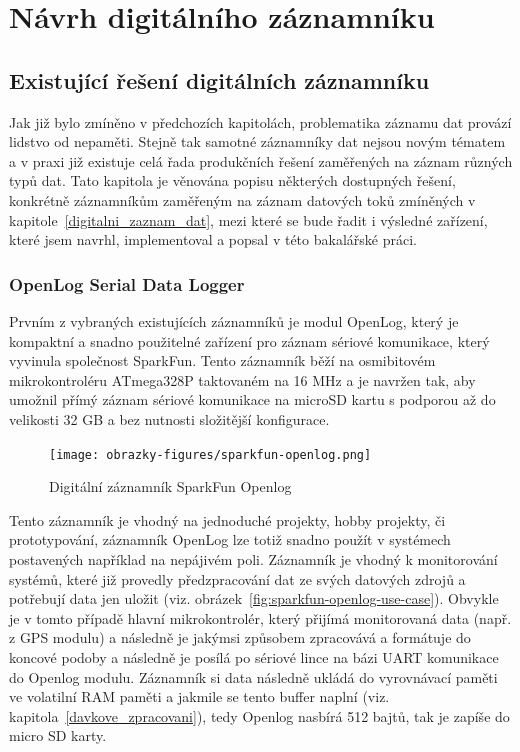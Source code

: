 \chapter{Návrh digitálního záznamníku}
\label{navrh_digitalniho_zaznamniku}

\section{Existující řešení digitálních záznamníku}
Jak již bylo zmíněno v předchozích kapitolách, problematika záznamu dat provází lidstvo od nepaměti. Stejně tak samotné záznamníky dat nejsou novým tématem a v praxi již existuje celá řada produkčních řešení zaměřených na záznam různých typů dat. Tato kapitola je věnována popisu některých dostupných řešení, konkrétně záznamníkům zaměřeným na záznam datových toků zmíněných v kapitole~\ref{digitalni_zaznam_dat}, mezi které se bude řadit i výsledné zařízení, které jsem navrhl, implementoval a popsal v této bakalářské práci. 


\subsection{OpenLog Serial Data Logger}
\label{openlog_serial_datalogger_module}
Prvním z vybraných existujících záznamníků je modul OpenLog, který je kompaktní a snadno použitelné zařízení pro záznam sériové komunikace, který vyvinula společnost SparkFun. Tento záznamník běží na osmibitovém mikrokontroléru ATmega328P taktovaném na 16 MHz a je navržen tak, aby umožnil přímý záznam sériové komunikace na microSD kartu s podporou až do velikosti 32 GB a bez nutnosti složitější konfigurace. \cite{sparkfun_openlog_tutorial}

\begin{figure}[h]
    \centering
    \texttt{[image: obrazky-figures/sparkfun-openlog.png]}
    
    \caption{Digitální záznamník SparkFun Openlog \cite{cirkit_openlog}}
    \label{fig:sparkfun-openlog}
\end{figure}

Tento záznamník je vhodný na jednoduché projekty, hobby projekty, či prototypování, záznamník OpenLog lze totiž snadno použít v systémech postavených například na nepájivém poli. Záznamník je vhodný k monitorování systémů, které již provedly předzpracování dat ze svých datových zdrojů a potřebují data jen uložit (viz. obrázek~\ref{fig:sparkfun-openlog-use-case}). Obvykle je v tomto případě hlavní mikrokontrolér, který přijímá monitorovaná data (např. z GPS modulu) a následně je jakýmsi způsobem zpracovává a formátuje do koncové podoby a následně je posílá po sériové lince na bázi UART komunikace do Openlog modulu. Záznamník si data následně ukládá do vyrovnávací paměti ve volatilní RAM paměti a jakmile se tento buffer naplní (viz. kapitola~\ref{davkove_zpracovani}), tedy Openlog nasbírá 512 bajtů, tak je zapíše do micro SD karty. \cite{cirkit_openlog}

